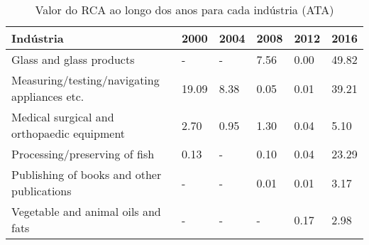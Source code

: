 \begin{table}
\centering
\caption{Valor do RCA ao longo dos anos para cada indústria (ATA)}
\label{tab:ex3-tempo-ATA}
\begin{tabular}{p{6cm}p{1.5cm}p{1.5cm}p{1.5cm}p{1.5cm}p{1.5cm}}
\toprule
                                   Indústria &  2000 & 2004 & 2008 & 2012 &  2016 \\
\midrule
                    Glass and glass products &     - &    - & 7.56 & 0.00 & 49.82 \\
Measuring/testing/navigating appliances etc. & 19.09 & 8.38 & 0.05 & 0.01 & 39.21 \\
  Medical surgical and orthopaedic equipment &  2.70 & 0.95 & 1.30 & 0.04 &  5.10 \\
               Processing/preserving of fish &  0.13 &    - & 0.10 & 0.04 & 23.29 \\
  Publishing of books and other publications &     - &    - & 0.01 & 0.01 &  3.17 \\
          Vegetable and animal oils and fats &     - &    - &    - & 0.17 &  2.98 \\
\bottomrule
\end{tabular}
\end{table}
